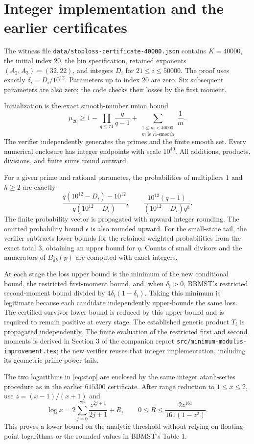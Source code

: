 \documentclass[11pt]{article}
\begin{document}
\section{Integer implementation and the earlier certificates}
The witness file \texttt{data/stoploss-certificate-40000.json} contains
$K=40000$, the initial index $20$, the bin specification, retained exponents
$(A_2,A_3)=(32,22)$, and integers $D_i$ for $21\leq i\leq50000$.
The proof uses exactly $\delta_i=D_i/10^{12}$. Parameters up to index $20$
are zero. Six subsequent parameters are also zero; the code checks their
losses by the first moment.

Initialization is the exact smooth-number union bound
\[
 \mu_{20}\geq1-\prod_{q\leq71}\frac q{q-1}
   +\sum_{\substack{1\leq m<40000\\m\text{ is }71\text{-smooth}}}\frac1m.
\]
The verifier independently generates the primes and the finite smooth set.
Every numerical enclosure has integer endpoints with scale $10^{40}$.
All additions, products, divisions, and finite sums round outward.

For a given prime and rational parameter, the probabilities of multipliers
$1$ and $h\geq2$ are exactly
\[
 \frac{q(10^{12}-D_i)-10^{12}}{q(10^{12}-D_i)},\qquad
 \frac{10^{12}(q-1)}{(10^{12}-D_i)q^h}.
\]
The finite probability vector is propagated with upward integer rounding.
The omitted probability bound $\epsilon$ is also rounded upward.
For the small-state tail, the verifier subtracts lower bounds for the
retained weighted probabilities from the exact total $3$, obtaining an
upper bound for $\eta$. Counts of small divisors and the numerators of
$B_{ab}(p)$ are computed with exact integers.

At each stage the loss upper bound is the minimum of the new conditional
bound, the restricted first-moment bound, and, when $\delta_i>0$, BBMST's
restricted second-moment bound divided by $4\delta_i(1-\delta_i)$.
Taking this minimum is legitimate because each candidate independently
upper-bounds the same loss. The certified survivor lower bound is reduced
by this upper bound and is required to remain positive at every stage.
The established generic product $T_i$ is propagated independently.
The finite evaluation of the restricted first and second moments is derived
in Section 3 of the companion report
\texttt{src/minimum-modulus-improvement.tex}; the new verifier reuses that
integer implementation, including its geometric prime-power tails.

The two logarithms in \eqref{eq:stop} are enclosed by the same integer
atanh-series procedure as in the earlier $615300$ certificate. After range
reduction to $1\leq x\leq2$, use $z=(x-1)/(x+1)$ and
\[
 \log x=2\sum_{j=0}^{79}\frac{z^{2j+1}}{2j+1}+R,
 \qquad 0\leq R\leq\frac{2z^{161}}{161(1-z^2)}.
\]
This proves a lower bound on the analytic threshold without relying on
floating-point logarithms or the rounded values in BBMST's Table 1.
\end{document}

